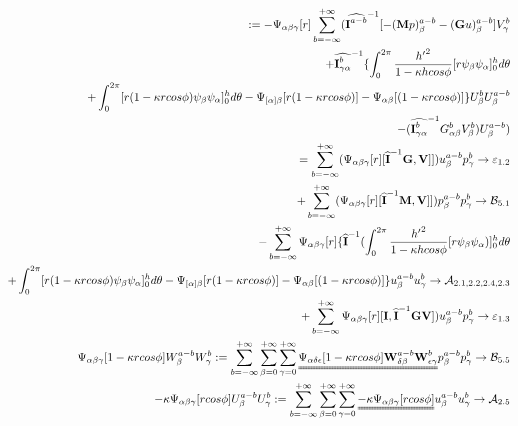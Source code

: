 \documentclass{Note}
\begin{document}
\begin{equation}
\begin{aligned}
:=-\Psi_{\alpha\beta\gamma}[r]\sum_{b=-\infty}^{+\infty}(\widehat{\textbf{I}^{a-b}}^{-1}[{-(\textbf{M}p)_\beta^{a-b}-(\textbf{G}u)_\beta^{a-b}]V_\gamma^{b}}\\
+\widehat{\textbf{I}_{\gamma\alpha}^b}^{-1}\{\int_0^{2\pi}{{h'}^2\over {1-\kappa h cos\phi}}[r \psi_\beta \psi_\alpha ]_0^h d\theta\\
+\int_0^{2\pi}[ r (1-\kappa r cos\phi) \psi_\beta \psi_\alpha]_0^h d\theta 
-\Psi_{[\alpha]\beta}[r(1-\kappa r cos\phi)]
-\Psi_{\alpha\beta}[(1-\kappa r cos\phi)]\}U_\beta^b U_\beta^{a-b}\\
-(\widehat{\textbf{I}_{\gamma\alpha}^b}^{-1} G_{\alpha\beta}^b V_\beta^b)U_\beta^{a-b})\\
=\sum_{b=-\infty}^{+\infty}(\Psi_{\alpha\beta\gamma}[r][\widehat{\textbf{I}}^{-1}\textbf{G},\textbf{V}]])u_\beta^{a-b}p_\gamma^{b}\rightarrow \mathcal{\varepsilon}_{1.2}\\
+\sum_{b=-\infty}^{+\infty}(\Psi_{\alpha\beta\gamma}[r][\widehat{\textbf{I}}^{-1} \textbf{M},\textbf{V}]])p_\beta^{a-b}p_\gamma^{b}\rightarrow\mathcal{B}_{5.1}\\
-\sum_{b=-\infty}^{+\infty}\Psi_{\alpha\beta\gamma}[r]\{\widehat{\textbf{I}}^{-1} (\int_0^{2\pi}{{h'}^2\over {1-\kappa h cos\phi}}[r \psi_\beta \psi_\alpha )]_0^h d\theta\\
+\int_0^{2\pi}[ r (1-\kappa r cos\phi) \psi_\beta \psi_\alpha]_0^h d\theta 
-\Psi_{[\alpha]\beta}[r(1-\kappa r cos\phi)]
-\Psi_{\alpha\beta}[(1-\kappa r cos\phi)]\}u_\beta^{a-b}u_\gamma^{b}\rightarrow\mathcal{A}_{2.1,2.2,2.4,2.3}\\
+\sum_{b=-\infty}^{+\infty}\Psi_{\alpha\beta\gamma}[r][\textbf{I},\widehat{\textbf{I}}^{-1} \textbf{GV}])u_\beta^{a-b}p_\gamma^{b}\rightarrow\mathcal{\varepsilon}_{1.3}\\
\Psi_{\alpha\beta\gamma}[1-\kappa rcos\phi]W_\beta^{a-b}W_\gamma^b:=\sum_{b=-\infty}^{+\infty} \sum_{\beta=0}^{+\infty}\sum_{\gamma=0}^{+\infty}\uuline{ \Psi_{\alpha\delta\epsilon}[1-\kappa r cos\phi]\textbf{W}_{\delta\beta}^{a-b}\textbf{W}_{\epsilon\gamma}^{b}}p_\beta^{a-b}p_\gamma^{b}\rightarrow\mathcal{B}_{5.5}\\
-\kappa \Psi_{\alpha\beta\gamma}[r cos\phi]U_\beta^{a-b}U_\gamma^b:=\sum_{b=-\infty}^{+\infty} \sum_{\beta=0}^{+\infty}\sum_{\gamma=0}^{+\infty}\uuline{-\kappa \Psi_{\alpha\beta\gamma}[ r cos\phi]}u_\beta^{a-b}u_\gamma^{b}\rightarrow\mathcal{A}_{2.5}\\
\end{aligned}
\end{equation}
\end{document}
